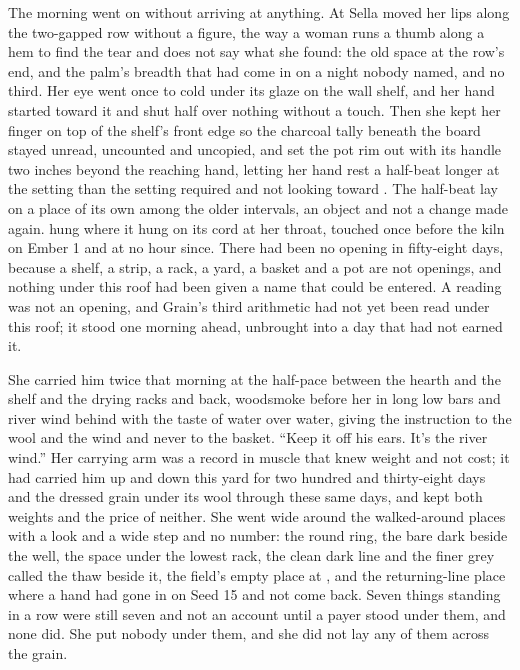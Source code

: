 \scenebreak

The morning went on without arriving at anything. At  Sella moved her lips along the two-gapped row without a figure, the way a woman runs a thumb along a hem to find the tear and does not say what she found: the old space at the row's end, and the palm's breadth that had come in on a night nobody named, and no third. Her eye went once to  cold under its glaze on the wall shelf, and her hand started toward it and shut half over nothing without a touch. Then she kept her finger on top of the shelf's front edge so the charcoal tally beneath the board stayed unread, uncounted and uncopied, and set the pot rim out with its handle two inches beyond the reaching hand, letting her hand rest a half-beat longer at the setting than the setting required and not looking toward . The half-beat lay on a place of its own among the older intervals, an object and not a change made again.  hung where it hung on its cord at her throat, touched once before the kiln on Ember 1 and at no hour since. There had been no opening in fifty-eight days, because a shelf, a strip, a rack, a yard, a basket and a pot are not openings, and nothing under this roof had been given a name that could be entered. A reading was not an opening, and Grain's third arithmetic had not yet been read under this roof; it stood one morning ahead, unbrought into a day that had not earned it.

She carried him twice that morning at the half-pace between the hearth and the shelf and the drying racks and back, woodsmoke before her in long low bars and river wind behind with the taste of water over water, giving the instruction to the wool and the wind and never to the basket. “Keep it off his ears. It's the river wind.” Her carrying arm was a record in muscle that knew weight and not cost; it had carried him up and down this yard for two hundred and thirty-eight days and the dressed grain under its wool through these same days, and kept both weights and the price of neither. She went wide around the walked-around places with a look and a wide step and no number: the round ring, the bare dark  beside the well, the space under the lowest rack, the clean dark line and the finer grey called the thaw beside it, the field's empty place at , and the returning-line place where a hand had gone in on Seed 15 and not come back. Seven things standing in a row were still seven and not an account until a payer stood under them, and none did. She put nobody under them, and she did not lay any of them across the grain.

